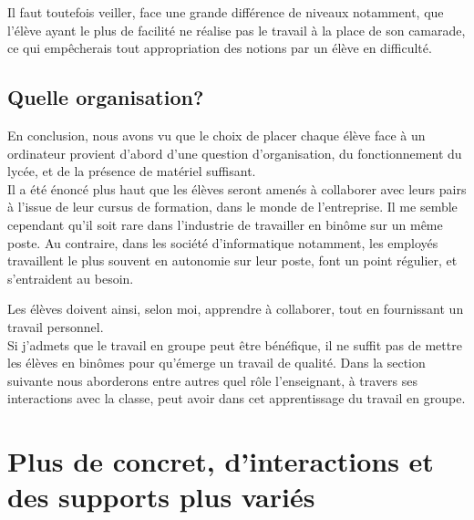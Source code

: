 \documentclass[pdftex,a4paper,12pt]{article}
\begin{document}
	Il faut toutefois veiller, face une grande différence de niveaux notamment,
	que l'élève ayant le plus de facilité ne réalise pas le travail à la place de son camarade, 
	ce qui empêcherais tout appropriation des notions par un élève en difficulté.

	\subsection{Quelle organisation?}
	En conclusion, nous avons vu que le choix de placer chaque élève face à un ordinateur provient d'abord d'une question d'organisation, 
	du fonctionnement du lycée, et de la présence de matériel suffisant.\\

	Il a été énoncé plus haut que les élèves seront amenés à collaborer avec leurs pairs à l'issue de leur cursus de formation, dans le monde de l'entreprise.
	Il me semble cependant qu'il soit rare dans l'industrie de travailler en binôme sur un même poste.
	Au contraire, dans les société d'informatique notamment, les employés travaillent le plus souvent en autonomie sur leur poste, 
	font un point régulier, et s'entraident au besoin.
	
	Les élèves doivent ainsi, selon moi, apprendre à collaborer, tout en fournissant un travail personnel.\\
	
	Si j'admets que le travail en groupe peut être bénéfique, il ne suffit pas de mettre les élèves en binômes pour qu'émerge un travail de qualité.
	Dans la section suivante nous aborderons entre autres quel rôle l'enseignant, à travers ses interactions avec la classe, peut avoir dans cet apprentissage du travail en groupe.

	\section{Plus de concret, d'interactions et des supports plus variés}
\end{document}
